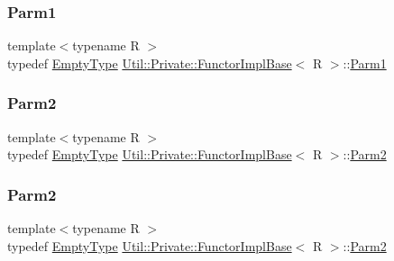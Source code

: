 \mbox{\label{structUtil_1_1Private_1_1FunctorImplBase_a9d61e693d6c616dea5bd9d9073c7d21a}} 
\subsubsection{\texorpdfstring{Parm1}{Parm1}\hspace{0.1cm}{\footnotesize\ttfamily [2/2]}}
{\footnotesize\ttfamily template$<$typename R $>$ \\
typedef \mbox{\hyperlink{classUtil_1_1EmptyType}{Empty\+Type}} \mbox{\hyperlink{structUtil_1_1Private_1_1FunctorImplBase}{Util\+::\+Private\+::\+Functor\+Impl\+Base}}$<$ R $>$\+::\mbox{\hyperlink{structUtil_1_1Private_1_1FunctorImplBase_a9d61e693d6c616dea5bd9d9073c7d21a}{Parm1}}}

\mbox{\label{structUtil_1_1Private_1_1FunctorImplBase_a554085cd798ef14838a59b528f0feb2e}} 
\subsubsection{\texorpdfstring{Parm2}{Parm2}\hspace{0.1cm}{\footnotesize\ttfamily [1/2]}}
{\footnotesize\ttfamily template$<$typename R $>$ \\
typedef \mbox{\hyperlink{classUtil_1_1EmptyType}{Empty\+Type}} \mbox{\hyperlink{structUtil_1_1Private_1_1FunctorImplBase}{Util\+::\+Private\+::\+Functor\+Impl\+Base}}$<$ R $>$\+::\mbox{\hyperlink{structUtil_1_1Private_1_1FunctorImplBase_a554085cd798ef14838a59b528f0feb2e}{Parm2}}}

\mbox{\label{structUtil_1_1Private_1_1FunctorImplBase_a554085cd798ef14838a59b528f0feb2e}} 
\subsubsection{\texorpdfstring{Parm2}{Parm2}\hspace{0.1cm}{\footnotesize\ttfamily [2/2]}}
{\footnotesize\ttfamily template$<$typename R $>$ \\
typedef \mbox{\hyperlink{classUtil_1_1EmptyType}{Empty\+Type}} \mbox{\hyperlink{structUtil_1_1Private_1_1FunctorImplBase}{Util\+::\+Private\+::\+Functor\+Impl\+Base}}$<$ R $>$\+::\mbox{\hyperlink{structUtil_1_1Private_1_1FunctorImplBase_a554085cd798ef14838a59b528f0feb2e}{Parm2}}}

